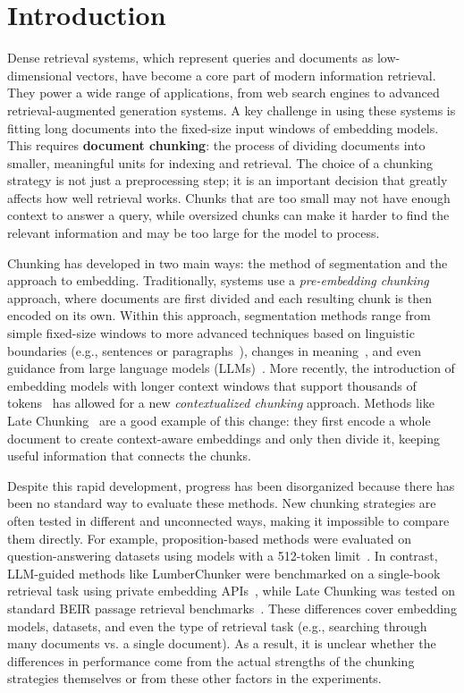 \section{Introduction}

Dense retrieval systems, which represent queries and documents as low-dimensional vectors, have become a core part of modern information retrieval. They power a wide range of applications, from web search engines to advanced retrieval-augmented generation systems. A key challenge in using these systems is fitting long documents into the fixed-size input windows of embedding models. This requires \textbf{document chunking}: the process of dividing documents into smaller, meaningful units for indexing and retrieval. The choice of a chunking strategy is not just a preprocessing step; it is an important decision that greatly affects how well retrieval works. Chunks that are too small may not have enough context to answer a query, while oversized chunks can make it harder to find the relevant information and may be too large for the model to process.

Chunking has developed in two main ways: the method of segmentation and the approach to embedding. Traditionally, systems use a \textit{pre-embedding chunking} approach, where documents are first divided and each resulting chunk is then encoded on its own. Within this approach, segmentation methods range from simple fixed-size windows to more advanced techniques based on linguistic boundaries (e.g., sentences or paragraphs~\cite{para}), changes in meaning~\cite{propositions2024}, and even guidance from large language models (LLMs)~\cite{densex2024,lumberchunker2024}. More recently, the introduction of embedding models with longer context windows that support thousands of tokens~\cite{e5,jina,bge} has allowed for a new \textit{contextualized chunking} approach. Methods like Late Chunking~\cite{latechunking2024} are a good example of this change: they first encode a whole document to create context-aware embeddings and only then divide it, keeping useful information that connects the chunks.

Despite this rapid development, progress has been disorganized because there has been no standard way to evaluate these methods. New chunking strategies are often tested in different and unconnected ways, making it impossible to compare them directly. For example, proposition-based methods were evaluated on question-answering datasets using models with a 512-token limit~\cite{propositions2024}. In contrast, LLM-guided methods like LumberChunker were benchmarked on a single-book retrieval task using private embedding APIs~\cite{lumberchunker2024}, while Late Chunking was tested on standard BEIR passage retrieval benchmarks~\cite{latechunking2024}. These differences cover embedding models, datasets, and even the type of retrieval task (e.g., searching through many documents vs. a single document). As a result, it is unclear whether the differences in performance come from the actual strengths of the chunking strategies themselves or from these other factors in the experiments.

